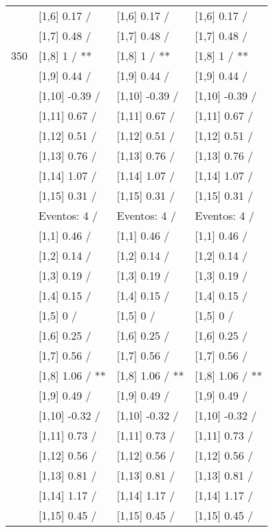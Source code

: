 \begin{table}
\begin{tabular}[t]{llll}
 & {}[1,6] 0.17  / & {}[1,6] 0.17  / & {}[1,6] 0.17  /\\
 & {}[1,7] 0.48  / & {}[1,7] 0.48  / & {}[1,7] 0.48  /\\
350 & {}[1,8] 1  / ** & {}[1,8] 1  / ** & {}[1,8] 1  / **\\
\addlinespace
 & {}[1,9] 0.44  / & {}[1,9] 0.44  / & {}[1,9] 0.44  /\\
 & {}[1,10] -0.39  / & {}[1,10] -0.39  / & {}[1,10] -0.39  /\\
 & {}[1,11] 0.67  / & {}[1,11] 0.67  / & {}[1,11] 0.67  /\\
 & {}[1,12] 0.51  / & {}[1,12] 0.51  / & {}[1,12] 0.51  /\\
 & {}[1,13] 0.76  / & {}[1,13] 0.76  / & {}[1,13] 0.76  /\\
\addlinespace
 & {}[1,14] 1.07  / & {}[1,14] 1.07  / & {}[1,14] 1.07  /\\
 & {}[1,15] 0.31  / & {}[1,15] 0.31  / & {}[1,15] 0.31  /\\
 & Eventos:  4 / & Eventos:  4 / & Eventos:  4 /\\
 & {}[1,1] 0.46  / & {}[1,1] 0.46  / & {}[1,1] 0.46  /\\
 & {}[1,2] 0.14  / & {}[1,2] 0.14  / & {}[1,2] 0.14  /\\
\addlinespace
 & {}[1,3] 0.19  / & {}[1,3] 0.19  / & {}[1,3] 0.19  /\\
 & {}[1,4] 0.15  / & {}[1,4] 0.15  / & {}[1,4] 0.15  /\\
 & {}[1,5] 0  / & {}[1,5] 0  / & {}[1,5] 0  /\\
 & {}[1,6] 0.25  / & {}[1,6] 0.25  / & {}[1,6] 0.25  /\\
 & {}[1,7] 0.56  / & {}[1,7] 0.56  / & {}[1,7] 0.56  /\\
\addlinespace
500 & {}[1,8] 1.06  / ** & {}[1,8] 1.06  / ** & {}[1,8] 1.06  / **\\
 & {}[1,9] 0.49  / & {}[1,9] 0.49  / & {}[1,9] 0.49  /\\
 & {}[1,10] -0.32  / & {}[1,10] -0.32  / & {}[1,10] -0.32  /\\
 & {}[1,11] 0.73  / & {}[1,11] 0.73  / & {}[1,11] 0.73  /\\
 & {}[1,12] 0.56  / & {}[1,12] 0.56  / & {}[1,12] 0.56  /\\
\addlinespace
 & {}[1,13] 0.81  / & {}[1,13] 0.81  / & {}[1,13] 0.81  /\\
 & {}[1,14] 1.17  / & {}[1,14] 1.17  / & {}[1,14] 1.17  /\\
 & {}[1,15] 0.45  / & {}[1,15] 0.45  / & {}[1,15] 0.45  /\\
\bottomrule
\end{tabular}
\end{table}
